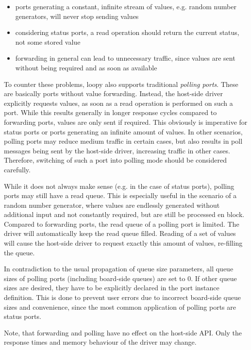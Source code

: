 \documentclass{report}
\begin{document}
\begin{itemize} \itemsep1pt \parskip0pt 
\item ports generating a constant, infinite stream of values, e.g. random number generators, will never stop sending values
\item considering status ports, a read operation should return the current status, not some stored value
\item forwarding in general can lead to unnecessary traffic, since values are sent without being required and as soon as available
\end{itemize}

To counter these problems, loopy also supports traditional \textit{polling ports}. These are basically ports without value forwarding. Instead, the host-side driver explicitly requests values, as soon as a read operation is performed on such a port. While this results generally in longer response cycles compared to forwarding ports, values are only sent if required. This obviously is imperative for status ports or ports generating an infinite amount of values. In other scenarios, polling ports may reduce medium traffic in certain cases, but also results in poll messages being sent by the host-side driver, increasing traffic in other cases. Therefore, switching of such a port into polling mode should be considered carefully.

While it does not always make sense (e.g. in the case of status ports), polling ports may still have a read queue. This is especially useful in the scenario of a random number generator, where values are endlessly generated without additional input and not constantly required, but are still be processed en block. Compared to forwarding ports, the read queue of a polling port is limited. The driver will automatically keep the read queue filled. Reading of a set of values will cause the host-side driver to request exactly this amount of values, re-filling the queue.

In contradiction to the usual propagation of queue size parameters, all queue sizes of polling ports (including board-side queues) are set to 0. If other queue sizes are desired, they have to be explicitly declared in the port instance definition. This is done to prevent user errors due to incorrect board-side queue sizes and convenience, since the most common application of polling ports are status ports.

Note, that forwarding and polling have no effect on the host-side API. Only the response times and memory behaviour of the driver may change.
\end{document}
